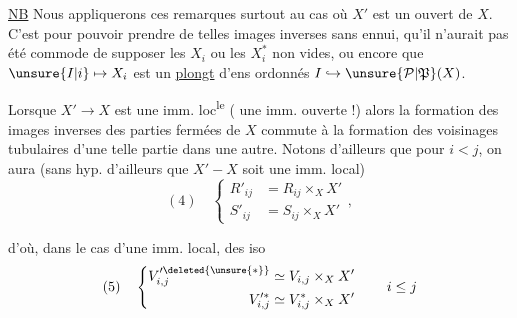 \uline{NB} Nous appliquerons ces remarques surtout au cas où $X'$ est un ouvert de $X$. C'est pour pouvoir prendre de telles images inverses sans ennui, qu'il n'aurait pas été commode de supposer les $X_i$ ou les $X_i^*$ non vides, ou encore que $\unsure{I|i}\mapsto X_i$ est un \uline{plongt} d'ens ordonnés $I\hookrightarrow\unsure{\mathcal P|\mathfrak P}(X)$.

Lorsque $X'\to X$ est une imm. loc\textsuperscript{le}     ( une imm. ouverte !) alors la formation des images inverses des parties  fermées de $X$ commute à la formation des voisinages tubulaires d'une telle partie dans une autre. Notons d'ailleurs que pour $i<j$, on aura (sans hyp. d'ailleurs que $X'-X$ soit une imm. local)
\[
(4)\quad\left\{\begin{aligned}
R'_{ij}&=R_{ij}\times_X X'\\
S'_{ij}&=S_{ij}\times_X X'
\end{aligned}\right.,
\]

d'où, dans le cas d'une imm. local,  des iso
\[
(5)\quad\left\{\begin{aligned}
V'^{\deleted{\unsure{*}}}_{i,j}&\simeq V_{i,j}\times_X X'\\
V'^{*}_{i,j}&\simeq V^*_{i,j}\times_X X'
\end{aligned}\right.\qquad i\leq j
\]

